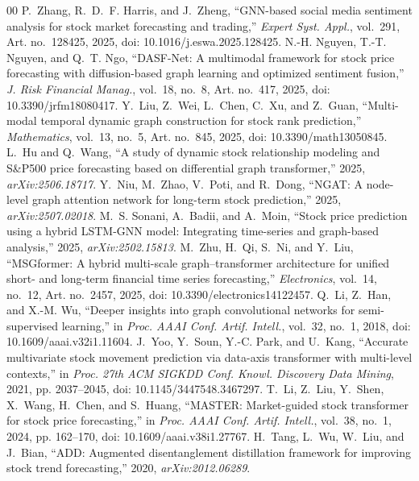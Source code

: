\documentclass[conference]{IEEEtran}
\begin{document}
\begin{thebibliography}{00}
 P.~Zhang, R.~D.~F. Harris, and J.~Zheng, ``GNN-based social media sentiment analysis for stock market forecasting and trading,'' \emph{Expert Syst. Appl.}, vol.~291, Art. no.~128425, 2025, doi: 10.1016/j.eswa.2025.128425.
 N.-H. Nguyen, T.-T. Nguyen, and Q.~T. Ngo, ``DASF-Net: A multimodal framework for stock price forecasting with diffusion-based graph learning and optimized sentiment fusion,'' \emph{J. Risk Financial Manag.}, vol.~18, no.~8, Art. no.~417, 2025, doi: 10.3390/jrfm18080417.
 Y.~Liu, Z.~Wei, L.~Chen, C.~Xu, and Z.~Guan, ``Multi-modal temporal dynamic graph construction for stock rank prediction,'' \emph{Mathematics}, vol.~13, no.~5, Art. no.~845, 2025, doi: 10.3390/math13050845.
 L.~Hu and Q.~Wang, ``A study of dynamic stock relationship modeling and S\&P500 price forecasting based on differential graph transformer,'' 2025, \emph{arXiv:2506.18717}.
 Y.~Niu, M.~Zhao, V.~Poti, and R.~Dong, ``NGAT: A node-level graph attention network for long-term stock prediction,'' 2025, \emph{arXiv:2507.02018}.
 M.~S. Sonani, A.~Badii, and A.~Moin, ``Stock price prediction using a hybrid LSTM-GNN model: Integrating time-series and graph-based analysis,'' 2025, \emph{arXiv:2502.15813}.
 M.~Zhu, H.~Qi, S.~Ni, and Y.~Liu, ``MSGformer: A hybrid multi-scale graph--transformer architecture for unified short- and long-term financial time series forecasting,'' \emph{Electronics}, vol.~14, no.~12, Art. no.~2457, 2025, doi: 10.3390/electronics14122457.
 Q.~Li, Z.~Han, and X.-M. Wu, ``Deeper insights into graph convolutional networks for semi-supervised learning,'' in \emph{Proc. AAAI Conf. Artif. Intell.}, vol.~32, no.~1, 2018, doi: 10.1609/aaai.v32i1.11604.
 J.~Yoo, Y.~Soun, Y.-C. Park, and U.~Kang, ``Accurate multivariate stock movement prediction via data-axis transformer with multi-level contexts,'' in \emph{Proc. 27th ACM SIGKDD Conf. Knowl. Discovery Data Mining}, 2021, pp. 2037--2045, doi: 10.1145/3447548.3467297.
 T.~Li, Z.~Liu, Y.~Shen, X.~Wang, H.~Chen, and S.~Huang, ``MASTER: Market-guided stock transformer for stock price forecasting,'' in \emph{Proc. AAAI Conf. Artif. Intell.}, vol.~38, no.~1, 2024, pp. 162--170, doi: 10.1609/aaai.v38i1.27767.
 H.~Tang, L.~Wu, W.~Liu, and J.~Bian, ``ADD: Augmented disentanglement distillation framework for improving stock trend forecasting,'' 2020, \emph{arXiv:2012.06289}.

\end{thebibliography}
\end{document}
